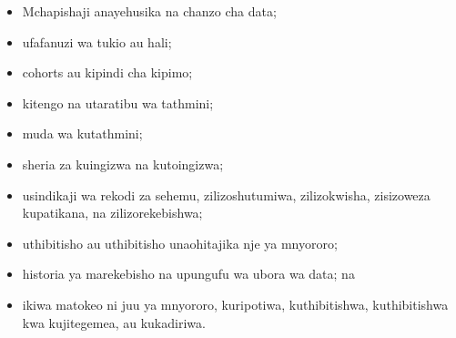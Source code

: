 \documentclass[11pt]{article}
\begin{document}
\begin{itemize}[leftmargin=*]
\item Mchapishaji anayehusika na chanzo cha data;
\item ufafanuzi wa tukio au hali;
\item cohorts au kipindi cha kipimo;
\item kitengo na utaratibu wa tathmini;
\item muda wa kutathmini;
\item sheria za kuingizwa na kutoingizwa;
\item usindikaji wa rekodi za sehemu, zilizoshutumiwa, zilizokwisha, zisizoweza kupatikana, na zilizorekebishwa;
\item uthibitisho au uthibitisho unaohitajika nje ya mnyororo;
\item historia ya marekebisho na upungufu wa ubora wa data; na
\item ikiwa matokeo ni juu ya mnyororo, kuripotiwa, kuthibitishwa, kuthibitishwa kwa kujitegemea, au kukadiriwa.
\end{itemize}
\end{document}
